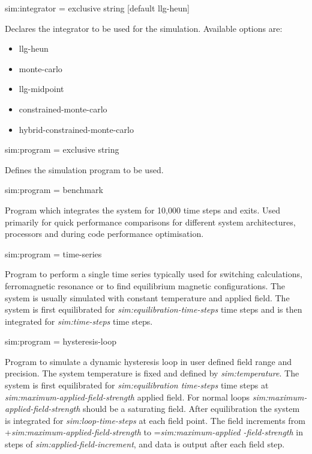 {\zicf sim:integrator = exclusive string [default llg-heun]} Declares the integrator to be used for the simulation. Available options are:
\begin{itemize}
  \item[] llg-heun
  \item[] monte-carlo
  \item[] llg-midpoint
  \item[] constrained-monte-carlo
  \item[] hybrid-constrained-monte-carlo
\end{itemize}

{\zicf sim:program = exclusive string} Defines the simulation program to be used.

{\zicf sim:program = benchmark} Program which integrates the system for 10,000 time steps and exits. Used primarily for quick performance comparisons for different system architectures, processors and during code performance optimisation.

{\zicf sim:program = time-series} Program to perform a single time series typically used for switching calculations, ferromagnetic resonance or to find equilibrium magnetic configurations. The system is usually simulated with constant temperature and applied field. The system is first equilibrated for \textit{sim:equilibration-time-steps} time steps and is then integrated for \textit{sim:time-steps} time steps.

{\zicf sim:program = hysteresis-loop} Program to simulate a dynamic hysteresis loop in user defined field range and precision. The system temperature is fixed and defined by \textit{sim:temperature}. The system is first equilibrated for \textit{sim:equilibration time-steps} time steps at \textit{sim:maximum-applied-field-strength} applied field. For normal loops \textit{sim:maximum-applied-field-strength} should be a saturating field. After equilibration the system is integrated for \textit{sim:loop-time-steps} at each field point. The field increments from +\textit{sim:maximum-applied-field-strength} to =\textit{sim:maximum-applied -field-strength} in steps of \textit{sim:applied-field-increment}, and data is output after each field step.

